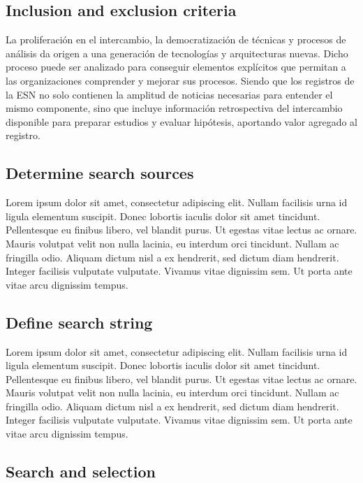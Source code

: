 \documentclass[a4paper,fleqn,spanish]{cas-dc}
\begin{document}
\subsection{ Inclusion and exclusion criteria}\label{criterio}

La proliferación en el intercambio, la democratización de técnicas y procesos
de análisis da origen a una generación de tecnologías y arquitecturas nuevas.
Dicho proceso puede ser analizado para conseguir elementos explícitos que
permitan a las organizaciones comprender y mejorar sus procesos. Siendo que los
registros de la ESN no solo contienen la amplitud de noticias necesarias para
entender el mismo componente, sino que incluye información retrospectiva del
intercambio disponible para preparar estudios y evaluar hipótesis, aportando
valor agregado al registro.

\subsection{ Determine search sources}\label{fuentes}

Lorem ipsum dolor sit amet, consectetur adipiscing elit. Nullam facilisis urna
id ligula elementum suscipit. Donec lobortis iaculis dolor sit amet tincidunt.
Pellentesque eu finibus libero, vel blandit purus. Ut egestas vitae lectus ac
ornare. Mauris volutpat velit non nulla lacinia, eu interdum orci tincidunt.
Nullam ac fringilla odio. Aliquam dictum nisl a ex hendrerit, sed dictum diam
hendrerit. Integer facilisis vulputate vulputate. Vivamus vitae dignissim sem.
Ut porta ante vitae arcu dignissim tempus.

\subsection{Define search string}\label{cadena}

Lorem ipsum dolor sit amet, consectetur adipiscing elit. Nullam facilisis urna
id ligula elementum suscipit. Donec lobortis iaculis dolor sit amet tincidunt.
Pellentesque eu finibus libero, vel blandit purus. Ut egestas vitae lectus ac
ornare. Mauris volutpat velit non nulla lacinia, eu interdum orci tincidunt.
Nullam ac fringilla odio. Aliquam dictum nisl a ex hendrerit, sed dictum diam
hendrerit. Integer facilisis vulputate vulputate. Vivamus vitae dignissim sem.
Ut porta ante vitae arcu dignissim tempus.


\subsection{Search and selection}\label{seleccion}
\end{document}
